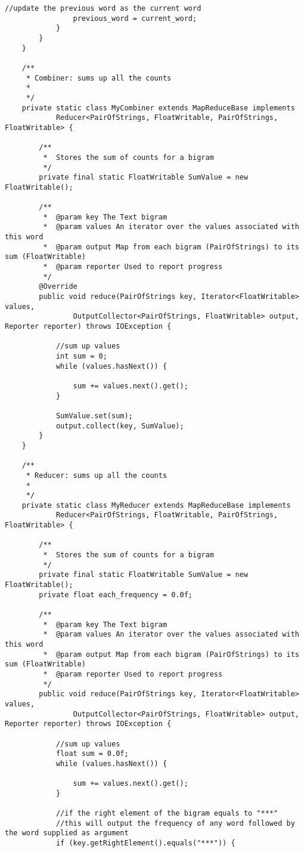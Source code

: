 \documentclass{article} %
\begin{document}
\begin{lstlisting}[style=Java]
				//update the previous word as the current word
				previous_word = current_word;
			}
		}
	}
	
	/**
	 * Combiner: sums up all the counts
	 *
	 */
	private static class MyCombiner extends MapReduceBase implements
			Reducer<PairOfStrings, FloatWritable, PairOfStrings, FloatWritable> {

		/**
		 *  Stores the sum of counts for a bigram
		 */
		private final static FloatWritable SumValue = new FloatWritable();

		/**
		 *  @param key The Text bigram 
		 *  @param values An iterator over the values associated with this word
		 *  @param output Map from each bigram (PairOfStrings) to its sum (FloatWritable)
		 *  @param reporter Used to report progress
		 */
		@Override
		public void reduce(PairOfStrings key, Iterator<FloatWritable> values,
				OutputCollector<PairOfStrings, FloatWritable> output, Reporter reporter) throws IOException {
			
			//sum up values
			int sum = 0;
			while (values.hasNext()) {
				
				sum += values.next().get();
			}
			
			SumValue.set(sum);
			output.collect(key, SumValue);
		}
	}

	/**
	 * Reducer: sums up all the counts
	 *
	 */
	private static class MyReducer extends MapReduceBase implements
			Reducer<PairOfStrings, FloatWritable, PairOfStrings, FloatWritable> {

		/**
		 *  Stores the sum of counts for a bigram
		 */
		private final static FloatWritable SumValue = new FloatWritable();
		private float each_frequency = 0.0f;

		/**
		 *  @param key The Text bigram 
		 *  @param values An iterator over the values associated with this word
		 *  @param output Map from each bigram (PairOfStrings) to its sum (FloatWritable)
		 *  @param reporter Used to report progress
		 */
		public void reduce(PairOfStrings key, Iterator<FloatWritable> values,
				OutputCollector<PairOfStrings, FloatWritable> output, Reporter reporter) throws IOException {
			
			//sum up values
			float sum = 0.0f;
			while (values.hasNext()) {
				
				sum += values.next().get();
			}
			
			//if the right element of the bigram equals to "***"
			//this will output the frequency of any word followed by the word supplied as argument
			if (key.getRightElement().equals("***")) {
				

\end{lstlisting}
\end{document}
